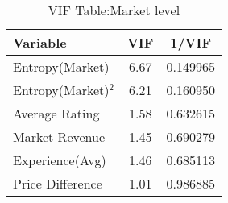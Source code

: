 \begin{table}[]
\centering
\begin{tabular}{@{}lcc@{}}
\toprule
Variable           & VIF  & 1/VIF    \\ \midrule
Entropy(Market)    & 6.67 & 0.149965 \\
Entropy(Market)$^2$ & 6.21 & 0.160950 \\
Average Rating     & 1.58 & 0.632615 \\
Market Revenue     & 1.45 & 0.690279 \\
Experience(Avg)    & 1.46 & 0.685113 \\
Price Difference   & 1.01 & 0.986885 \\ \bottomrule
\end{tabular}
\caption{VIF Table:Market level}
\label{vif_mkt}
\end{table}